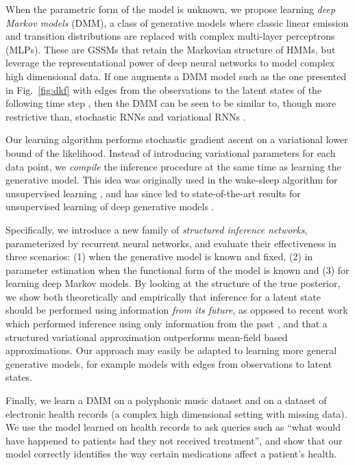 \documentclass[letterpaper]{article}
\theoremstyle{plain}
\newcommand{\DKF}{DMM\xspace}
\newcommand{\DMM}{DMM\xspace}
\begin{document}
When the parametric form of the model is unknown, 
we propose learning {\em deep Markov models} (\DKF), a class of generative models 
where classic linear emission and
transition distributions 
are replaced with complex multi-layer perceptrons (MLPs).
These are GSSMs that retain the 
Markovian structure of HMMs, but
leverage the representational power of deep neural 
networks to model complex high dimensional data. 
If one augments a \DKF model such as the one presented in Fig.~\ref{fig:dkf} with edges from the observations 
to the latent states of the following time step , then the \DKF 
 can be seen to be similar to, though more restrictive than, stochastic RNNs \cite{bayer2014learning} and variational RNNs
\cite{chung2015recurrent}.

Our learning algorithm performs stochastic gradient ascent on
a variational lower bound of the likelihood. 
Instead of introducing
variational parameters for each data point, we {\em compile} the
inference procedure at the same time as learning the generative model. 
This idea was originally used in the wake-sleep algorithm for
unsupervised learning \cite{hinton1995wake}, and has since led to 
state-of-the-art results for unsupervised learning of deep
generative models \cite{kingma2013auto,mnih2014neural,rezende2014stochastic}. 

Specifically, we introduce a new family of {\em structured
 inference networks}, parameterized by recurrent neural networks, and
evaluate their effectiveness in three scenarios: 
(1) when the generative model is known and fixed, 
(2) in parameter estimation when the functional form of the model is known 
and (3) for learning deep Markov models.
By looking at the structure of the true posterior, we show both
theoretically and empirically that inference for a latent state should
be performed using information \emph{from its future}, as opposed to
recent work which performed inference using only information from the
past \cite{chung2015recurrent,gan2015deep,gregor2015draw}, and that a
structured variational approximation outperforms mean-field based approximations.
Our approach may easily be 
adapted to learning more general generative models, for example models
with edges from observations to latent states.  

Finally, we learn a \DMM on a polyphonic music dataset and on a dataset of
electronic health records (a complex high dimensional setting with missing data). We use the model learned on health records to ask queries such as ``what would have happened to patients had they not received treatment'', and show that our model correctly identifies the way certain medications affect a patient's health.
\end{document}
